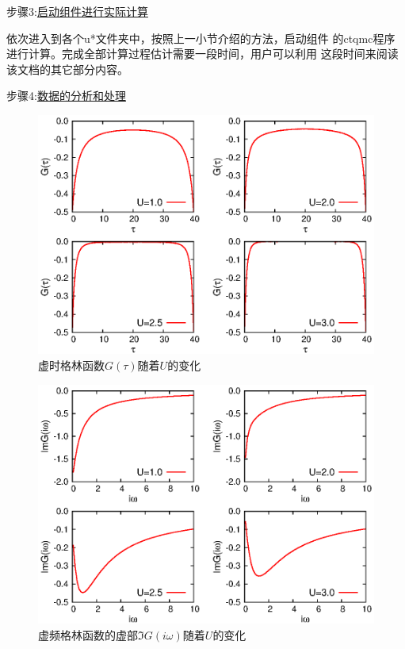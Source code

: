 步骤3:\underline{启动{\azalea}组件进行实际计算}

依次进入到各个u*文件夹中，按照上一小节介绍的方法，启动{\azalea}组件
的ctqmc程序进行计算。完成全部计算过程估计需要一段时间，用户可以利用
这段时间来阅读该文档的其它部分内容。

步骤4:\underline{数据的分析和处理}

\begin{figure}
\centering
\includegraphics{figure/green-mit.eps}
\caption{虚时格林函数$G(\tau)$随着$U$的变化} 
\label{fig:green-mit}
\end{figure}

\begin{figure}
\centering
\includegraphics{figure/grn-mit.eps}
\caption{虚频格林函数的虚部$\Im G(i\omega)$随着$U$的变化} 
\label{fig:grnim-mit}
\end{figure}

